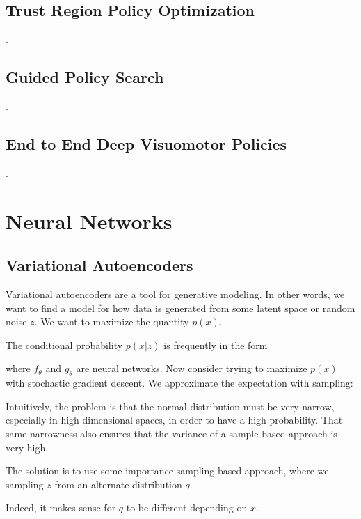\documentclass[12pt]{article}
\begin{document}
\subsection{Trust Region Policy Optimization}
.
\subsection{Guided Policy Search}
.
\subsection{End to End Deep Visuomotor Policies}
.

\section{Neural Networks}

\subsection{Variational Autoencoders}

Variational autoencoders are a tool for generative modeling. In other words, we want to find a model for how data is generated from some latent space or random noise $z$. We want to maximize the quantity $p(x)$.


The conditional probability $p(x|z)$ is frequently in the form


where $f_\theta$ and $g_\theta$ are neural networks. Now consider trying to maximize $p(x)$ with stochastic gradient descent. We approximate the expectation with sampling:


Intuitively, the problem is that the normal distribution must be very narrow, especially in high dimensional spaces, in order to have a high probability. That same narrowness also ensures that the variance of a sample based approach is very high.

The solution is to use some importance sampling based approach, where we sampling $z$ from an alternate distribution $q$. 


Indeed, it makes sense for $q$ to be different depending on $x$. 
\end{document}
